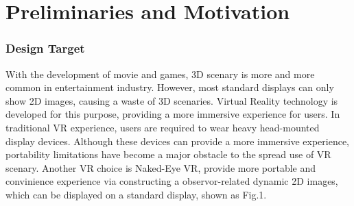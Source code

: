 \part{Preliminaries and Motivation}
\section{Design Target}
    With the development of movie and games, 3D scenary is more and more common in entertainment industry. However, most standard displays can only show 2D images, causing a waste of 3D scenaries. Virtual Reality technology is developed for this purpose, providing a more immersive experience for users. In traditional VR experience, users are required to wear heavy head-mounted display devices. Although these devices can provide a more immersive experience, portability limitations have become a major obstacle to the spread use of VR scenary. Another VR choice is Naked-Eye VR, provide more portable and convinience experience via constructing a observor-related dynamic 2D images, which can be displayed on a standard display, shown as Fig.1. 
